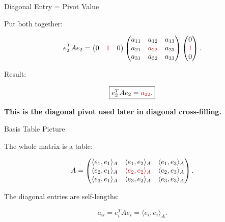 \documentclass[10pt]{beamer}
\theoremstyle{definition}
\newcommand{\x}[1]{\alert{\textbf{#1}}}
\newcommand{\rd}[1]{{\color{red!70!black}#1}}
\begin{document}
\begin{frame}{Diagonal Entry = Pivot Value}

Put both together:

$$
e_2^TAe_2
=
\begin{pmatrix}0&\rd{1}&0\end{pmatrix}
\begin{pmatrix}
a_{11}&a_{12}&a_{13}\\
a_{21}&\rd{a_{22}}&a_{23}\\
a_{31}&a_{32}&a_{33}
\end{pmatrix}
\begin{pmatrix}0\\\rd{1}\\0\end{pmatrix}.
$$

\vfill

Result:

$$
\boxed{e_2^TAe_2=\rd{a_{22}}.}
$$

\vfill

\begin{center}
\x{This is the diagonal pivot used later in diagonal cross-filling.}
\end{center}

\end{frame}


\begin{frame}{Basis Table Picture}

The whole matrix is a table:

$$
A=
\begin{pmatrix}
\langle e_1,e_1\rangle_A & \langle e_1,e_2\rangle_A & \langle e_1,e_3\rangle_A\\
\langle e_2,e_1\rangle_A & \rd{\langle e_2,e_2\rangle_A} & \langle e_2,e_3\rangle_A\\
\langle e_3,e_1\rangle_A & \langle e_3,e_2\rangle_A & \langle e_3,e_3\rangle_A
\end{pmatrix}.
$$

\vfill

The diagonal entries are self-lengths:

$$
a_{ii}=e_i^TAe_i=\langle e_i,e_i\rangle_A.
$$

\end{frame}


\end{document}
